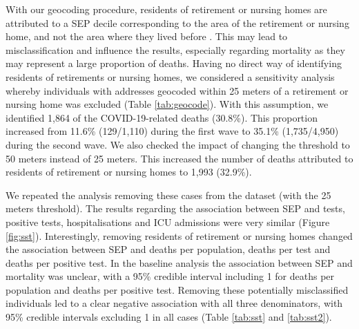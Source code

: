 \documentclass{article}
\begin{document}
	With our geocoding procedure, residents of retirement or nursing homes are attributed to a SEP decile corresponding to the area of the retirement or nursing home, and not the area where they lived before .
	This may lead to misclassification and influence the results, especially regarding mortality as they may represent a large proportion of deaths.
	Having no direct way of identifying residents of retirements or nursing homes, we considered a sensitivity analysis whereby individuals with addresses geocoded within 25 meters of a retirement or nursing home was excluded (Table \ref{tab:geocode}).
	With this assumption, we identified 1,864 of the COVID-19-related deaths (30.8\%).
	This proportion increased from 11.6\% (129/1,110) during the first wave to 35.1\% (1,735/4,950) during the second wave.
	We also checked the impact of changing the threshold to 50 meters instead of 25 meters. This increased the number of deaths attributed to residents of retirement or nursing homes to 1,993 (32.9\%).
	
	We repeated the analysis removing these cases from the dataset (with the 25 meters threshold).
	The results regarding the association between SEP and tests, positive tests, hospitalisations and ICU admissions were very similar (Figure \ref{fig:sst}).
	Interestingly, removing residents of retirement or nursing homes changed the association between SEP and deaths per population, deaths per test and deaths per positive test.
	In the baseline analysis the association between SEP and mortality was unclear, with a 95\% credible interval including 1 for deaths per population and deaths per positive test.
	Removing these potentially misclassified individuals led to a clear negative association with all three denominators, with 95\% credible intervals excluding 1 in all cases (Table \ref{tab:sst} and \ref{tab:sst2}).
	
\end{document}

